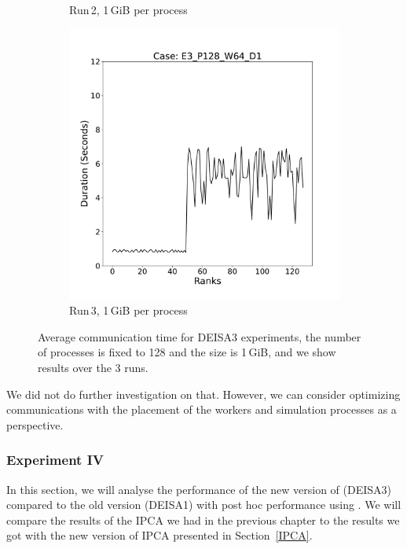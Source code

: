 \begin{figure}
\begin{subfigure}[b]{0.3\textwidth}
         \caption{Run\,2, 1\,GiB per process}
         \label{fig:E2_1_d3}
     \end{subfigure}
      \hfill
     \begin{subfigure}[b]{0.3\textwidth}
         \centering
         \includegraphics[width=\textwidth, height=\textwidth]{figures/E3_P128_W64_D1.pdf}
         \caption{Run\,3, 1\,GiB per process}
         \label{fig:E3_1_d3}
     \end{subfigure}
        \caption{Average communication time for DEISA3 experiments, the number of processes is fixed to 128 and the size is 1\,GiB, and we show results over the 3 runs.}
        \label{fig:variability3}
\end{figure}


We did not do further investigation on that. However, we can consider optimizing communications with the placement of the workers and simulation processes as a perspective.

\subsubsection{Experiment IV}\label{XP4}
In this section, we will analyse the performance of the new version of \deisa (DEISA3) compared to the old version (DEISA1) with post hoc performance using \dask. We will compare the results of the IPCA we had in the previous chapter to the results we got with the new version of IPCA presented in Section~\ref{IPCA}. 

